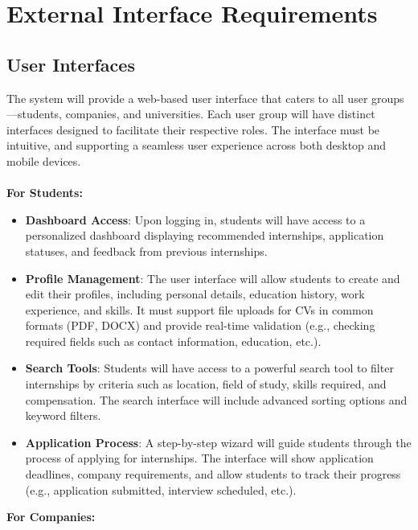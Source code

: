 \section{External Interface Requirements}

\subsection{User Interfaces}

The system will provide a web-based user interface that caters to all user groups—students, companies, and universities. Each user group will have distinct interfaces designed to facilitate their respective roles. The interface must be intuitive, and supporting a seamless user experience across both desktop and mobile devices. \\ \\
\vspace{5mm}
\textbf{For Students:}
\begin{itemize}
    \item \textbf{Dashboard Access}: Upon logging in, students will have access to a personalized dashboard displaying recommended internships, application statuses, and feedback from previous internships.
    \item \textbf{Profile Management}: The user interface will allow students to create and edit their profiles, including personal details, education history, work experience, and skills. It must support file uploads for CVs in common formats (PDF, DOCX) and provide real-time validation (e.g., checking required fields such as contact information, education, etc.).
    \item \textbf{Search Tools}: Students will have access to a powerful search tool to filter internships by criteria such as location, field of study, skills required, and compensation. The search interface will include advanced sorting options and keyword filters.
    \item \textbf{Application Process}: A step-by-step wizard will guide students through the process of applying for internships. The interface will show application deadlines, company requirements, and allow students to track their progress (e.g., application submitted, interview scheduled, etc.).
\end{itemize}
\vspace{5mm}
\textbf{For Companies:}

